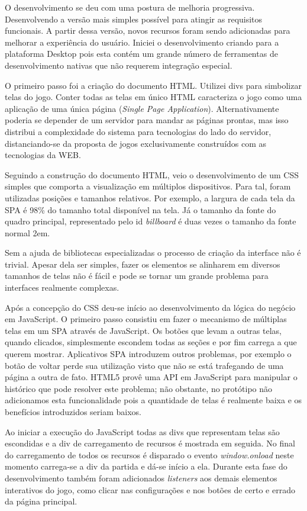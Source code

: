 O desenvolvimento se deu com uma postura de melhoria progressiva.
Desenvolvendo a versão mais simples possível para atingir as
requisitos funcionais. A partir dessa versão, novos recursos foram
sendo adicionadas para melhorar a experiência do usuário. Iniciei o
desenvolvimento criando para a plataforma Desktop pois esta contém
um grande número de ferramentas de desenvolvimento nativas que não
requerem integração especial.

O primeiro passo foi a criação do documento HTML. Utilizei divs
para simbolizar telas do jogo. Conter todas as telas em único
HTML caracteriza o jogo como uma aplicação de uma única página
(\textit{Single Page Application}). Alternativamente poderia se depender
de um servidor para mandar as páginas prontas, mas isso distribui
a complexidade do sistema para tecnologias do lado do servidor,
distanciando-se da proposta de jogos exclusivamente construídos com as
tecnologias da WEB.

Seguindo a construção do documento HTML, veio o desenvolvimento de um
CSS simples que comporta a visualização em múltiplos dispositivos.
Para tal, foram utilizadas posições e tamanhos relativos. Por exemplo,
a largura de cada tela da SPA é 98\% do tamanho total disponível na
tela. Já o tamanho da fonte do quadro principal, representado pelo id
\textit{billboard} é duas vezes o tamanho da fonte normal 2em.

Sem a ajuda de bibliotecas especializadas o processo de criação da
interface não é trivial. Apesar dela ser simples, fazer os
elementos se alinharem em diversos tamanhos de telas não é fácil e
pode se tornar um grande problema para interfaces realmente complexas.

Após a concepção do CSS deu-se início ao desenvolvimento da lógica
do negócio em JavaScript. O primeiro passo consistiu em fazer o
mecanismo de múltiplas telas em um SPA através de JavaScript. Os
botões que levam a outras telas, quando clicados, simplesmente escondem
todas as seções e por fim carrega a que querem mostrar. Aplicativos
SPA introduzem outros problemas, por exemplo o botão de voltar
perde sua utilização visto que não se está trafegando de uma página
a outra de fato. HTML5 provê uma API em JavaScript para manipular o histórico
que pode resolver este problema; não obstante, no protótipo não
adicionamos esta funcionalidade pois a quantidade de telas é realmente
baixa e os benefícios introduzidos seriam baixos.

Ao iniciar a execução do JavaScript todas as divs que representam
telas são escondidas e a div de carregamento de recursos é mostrada em
seguida. No final do carregamento de todos os recursos é disparado o
evento \textit{window.onload} neste momento carrega-se a div da partida
e dá-se início a ela. Durante esta fase do desenvolvimento também
foram adicionados \textit{listeners} aos demais elementos interativos do
jogo, como clicar nas configurações e nos botões de certo e errado da
página principal.

